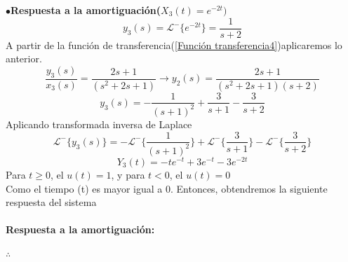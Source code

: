 \documentclass[11pt,a4paper]{article}
\begin{document}
{{\begin{enumerate}
	$\bullet$\textbf{Respuesta a la amortiguación($X_3(t)= e^{-2t})$}\\
	$$y_3(s)=\mathcal{L^{-}}{\lbrace e^{-2t} \rbrace}= \dfrac{1}{s+2}$$
	A partir de la función de transferencia(\ref{Función transferencia4})aplicaremos lo anterior.
	$$\dfrac{y_3(s)}{x_3(s)}= \dfrac{2s+1}{(s^2 +2s+1)} \rightarrow  y_2(s)= \dfrac{2s+1}{(s^2 +2s+1)(s+2)}$$
	$$ y_3(s)= - \dfrac{1}{(s+1)^2}+ \dfrac{3}{s+1} - \dfrac{3}{s+2}$$
	Aplicando transformada inversa de Laplace
	$$\mathcal{L^{-}}{\lbrace y_3(s)\rbrace }= - \mathcal{L^{-}}{\lbrace \dfrac{1}{(s+1)^2}\rbrace}+\mathcal{L^{-}}{\lbrace \dfrac{3}{s+1} \rbrace }-\mathcal{L^{-}}{\lbrace \dfrac{3}{s+2} \rbrace } $$
	$$Y_3(t)=-te^{-t}+3e^{-t}-3e^{-2t}$$
	Para $t \geq 0$, el $u(t)=1$, y para  $t < 0$, el $u(t)=0$\\
	Como el tiempo (t) es  mayor igual a 0. Entonces, obtendremos la siguiente respuesta del sistema\\\\
	\textbf{Respuesta a la amortiguación:}
	\begin{center}
	$\therefore$ 
	\end{center}
	\end{enumerate}
	}}
	
	\newpage
\end{document}
